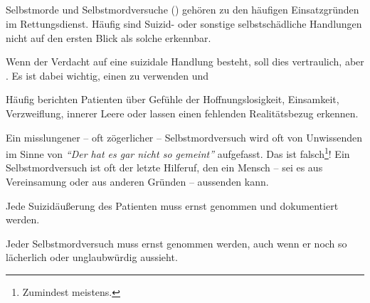 
\subsection{}

\Text
{{\TxBeschreibung}}%
{%
\label{topic:suizidalität}%
\label{topic:suizid1}%
%
Selbstmorde und Selbstmordversuche () gehören zu den
häufigen Einsatzgründen im Rettungsdienst. Häufig sind
Suizid- oder sonstige selbstschädliche Handlungen nicht auf
den ersten Blick als solche erkennbar. 

Wenn der Verdacht auf eine suizidale Handlung besteht, soll
dies vertraulich, aber . Es ist dabei wichtig, einen 
zu verwenden und 

\begin{quotation}

\end{quotation}

Häufig berichten Patienten über Gefühle der
Hoffnungslosigkeit, Einsamkeit, Verzweiflung, innerer Leere
oder lassen einen fehlenden Realitätsbezug erkennen.

Ein misslungener -- oft zögerlicher -- Selbstmordversuch
wird oft von Unwissenden im Sinne von \emph{\enquote{Der hat es gar nicht so gemeint}}
aufgefasst. Das ist falsch\footnote{Zumindest meistens.}!
Ein Selbstmordversuch ist oft der letzte Hilferuf, den ein
Mensch -- sei es aus Vereinsamung oder aus anderen Gründen
-- aussenden kann. 
}%


\begin{Danger}
  \item Jede Suizidäußerung des Patienten muss ernst
  genommen und dokumentiert werden.
  \item Jeder Selbstmordversuch muss ernst genommen
  werden, auch wenn er noch so lächerlich oder unglaubwürdig
  aussieht.
\end{Danger}


